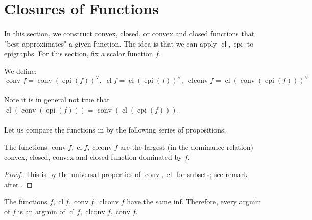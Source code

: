 \section{Closures of Functions}
\label{sect:023}

\paragraph{}In this section, we construct convex, closed, or convex and closed functions that "best approximates" a given function. The idea is that we can apply $\operatorname{cl},\operatorname{epi}$ to epigraphs. For this section, fix a scalar function $f$.

\begin{defn}
	\label{defn:023-closure-funcs}
	We define:
	\[
		\operatorname{conv}f=
		\operatorname{conv}(\operatorname{epi}(f))^\vee,\;
		\operatorname{cl}f=
		\operatorname{cl}(\operatorname{epi}(f))^\vee,\;
		\operatorname{clconv}f=
		\operatorname{cl}(\operatorname{conv} (\operatorname{epi}(f)))^\vee
	\]
\end{defn}
\paragraph{}Note it is in general not true that $\operatorname{cl}(\operatorname{conv} (\operatorname{epi}(f)))=\operatorname{conv}(\operatorname{cl} (\operatorname{epi}(f)))$.
\paragraph{}Let us compare the functions in  by the following series of propositions.

\begin{prop}\label{prop:023-closure-univ}
	The functions $\operatorname{conv}f,\operatorname{cl}f,\operatorname{clconv}f$ are the largest (in the dominance relation) convex, closed, convex and closed function dominated by $f$.
\end{prop}

\begin{proof}
	This is by the universal properties of $\operatorname{conv},\operatorname{cl}$ for subsets; see remark after .
\end{proof}


\begin{prop}[Optimality]
	\label{prop:023-closure-optimality}
	The functions $f,\operatorname{cl}f,\operatorname{conv}f,\operatorname{clconv}f$ have the same inf. Therefore, every argmin of $f$ is an argmin of $\operatorname{cl}f,\operatorname{clconv}f,\operatorname{conv}f$.
\end{prop}


